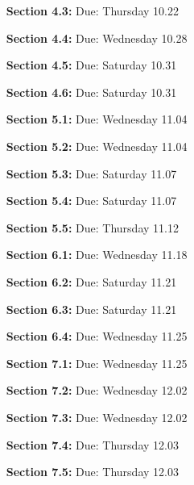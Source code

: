 \documentclass{article}
\begin{document}
\begin{enumerate}
\item[\bf Section 4.3:] {\color{blue} Due: Thursday 10.22}

\item[\bf Section 4.4:] {\color{blue} Due: Wednesday 10.28}

\item[\bf Section 4.5:] {\color{blue} Due: Saturday 10.31}

\item[\bf Section 4.6:] {\color{blue} Due: Saturday 10.31}

\item[\bf Section 5.1:] {\color{blue} Due: Wednesday 11.04}

\item[\bf Section 5.2:] {\color{blue} Due: Wednesday 11.04}

\item[\bf Section 5.3:] {\color{blue} Due: Saturday 11.07}

\item[\bf Section 5.4:] {\color{blue} Due: Saturday 11.07}

\item[\bf Section 5.5:] {\color{blue} Due: Thursday 11.12}

\item[\bf Section 6.1:] {\color{blue} Due: Wednesday 11.18}

\item[\bf Section 6.2:] {\color{blue} Due: Saturday 11.21}

\item[\bf Section 6.3:] {\color{blue} Due: Saturday 11.21}

\item[\bf Section 6.4:] {\color{blue} Due: Wednesday 11.25}

\item[\bf Section 7.1:] {\color{blue} Due: Wednesday 11.25}

\item[\bf Section 7.2:] {\color{blue} Due: Wednesday 12.02}

\item[\bf Section 7.3:] {\color{blue} Due: Wednesday 12.02}

\item[\bf Section 7.4:] {\color{blue} Due: Thursday 12.03}

\item[\bf Section 7.5:] {\color{blue} Due: Thursday 12.03}


\end{enumerate}
\end{document}
